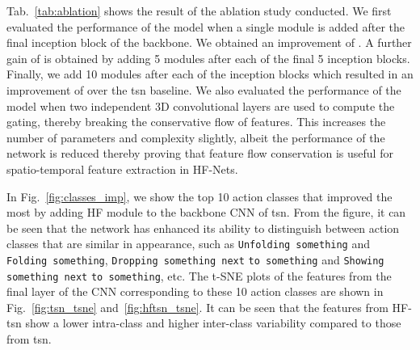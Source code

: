 \documentclass[journal,onecolumn]{IEEEtran}
\begin{document}
Tab.~\ref{tab:ablation} shows the result of the ablation study conducted. We first evaluated the performance of the model when a single module is added after the final inception block of the backbone. We obtained an improvement of . A further gain of  is obtained by adding 5 modules after each of the final 5 inception blocks. Finally, we add 10 modules after each of the inception blocks which resulted in an improvement of  over the \ac{tsn} baseline. We also evaluated the performance of the model when two independent 3D convolutional layers are used to compute the gating, thereby breaking the conservative flow of features. This increases the number of parameters and complexity slightly, albeit the performance of the network is reduced thereby proving that feature flow conservation is useful for spatio-temporal feature extraction in HF-Nets.



In Fig.~\ref{fig:classes_imp}, we show the top 10 action classes that improved the most by adding HF module to the backbone CNN of \ac{tsn}. From the figure, it can be seen that the network has enhanced its ability to distinguish between action classes that are similar in appearance, such as \verb+Unfolding something+ and \verb+Folding something+, \verb+Dropping something next+ \verb+to something+ and \verb+Showing something next+ \verb+to something+, etc. The t-SNE plots of the features from the final layer of the CNN corresponding to these 10 action classes are shown in Fig.~\ref{fig:tsn_tsne} and~\ref{fig:hftsn_tsne}. It can be seen that the features from HF-\ac{tsn} show a lower intra-class and higher inter-class variability compared to those from \ac{tsn}.
\end{document}
